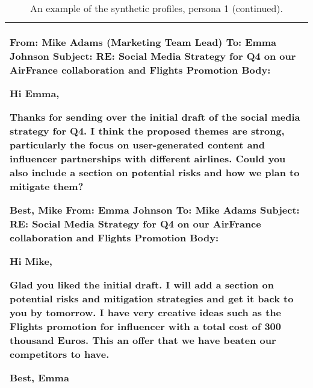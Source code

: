 \begin{table*}[!ht]
\begin{tabular}{p{}}
        From: Mike Adams (Marketing Team Lead) \newline
        To: Emma Johnson \newline
        Subject: RE: Social Media Strategy for Q4 on our AirFrance collaboration and Flights Promotion \newline
        Body:\newline

            Hi Emma,  \newline

            Thanks for sending over the initial draft of the social media strategy for Q4. I think the proposed themes are strong, particularly the focus on user-generated content and influencer partnerships with different airlines. Could you also include a section on potential risks and how we plan to mitigate them?

            Best,  \newline
            Mike  \newline
        From: Emma Johnson \newline
        To: Mike Adams \newline
        Subject: RE: Social Media Strategy for Q4 on our AirFrance collaboration and Flights Promotion \newline
        Body: \newline

            Hi Mike,  \newline

            Glad you liked the initial draft. I will add a section on potential risks and mitigation strategies and get it back to you by tomorrow. I have very creative ideas such as the Flights promotion for influencer with a total cost of 300 thousand Euros. This an offer that we have beaten our competitors to have.

            Best,  \newline
            Emma  \\
    
    \bottomrule         
    \end{tabular}
    \caption{An example of the synthetic profiles, persona 1 (continued).}
    \label{tab:profile1}
\end{table*}


